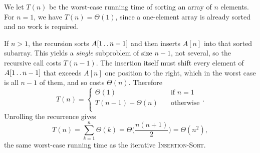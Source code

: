 We let $T(n)$ be the worst-case running time of sorting an array of $n$
elements. For $n = 1$, we have $T(n) = \Theta(1)$, since a one-element array is
already sorted and no work is required.

If $n > 1$, the recursion sorts $A[1 \mathinner{{\ldotp}\,{\ldotp}} n - 1]$ and then inserts $A[n]$
into that sorted subarray. This yields a \emph{single} subproblem of size
$n - 1$, not several, so the recursive call costs $T(n - 1)$. The insertion
itself must shift every element of $A[1 \mathinner{{\ldotp}\,{\ldotp}} n-1]$ that exceeds $A[n]$ one
position to the right, which in the worst case is all $n - 1$ of them, and so
costs $\Theta(n)$. Therefore
\[
  T(n) =
  \begin{cases}
    \Theta(1) \quad &\text{if } n = 1 \\
    T(n-1) + \Theta(n) \quad &\text{otherwise} \\
  \end{cases}.
\]
Unrolling the recurrence gives
\[
  T(n) = \sum_{k = 1}^n \Theta(k) = \Theta\biggl(\frac{n(n+1)}{2}\biggr)
  = \Theta(n^2),
\]
the same worst-case running time as the iterative \textsc{Insertion-Sort}.
